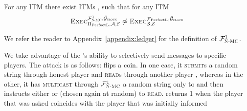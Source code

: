   \begin{theorem}
    \label{theorem:perfectledger}
    For any ITM \perfectprot{} there exist ITMs \perfectenv,
    \perfectadv{} such that for any ITM \simulator
    \begin{equation*}
      \textsc{Exec}^{\mathcal{F}_{\textsc{N-MC}}^1, \bar{\mathcal{G}}_{\textsc{clock}}}_{\Pi_{\mathrm{PerfectL}}, \mathcal{A},
      \mathcal{E}} \not\approx \textsc{Exec}^{\mathcal{F}_{\mathrm{PerfectL}},
      \bar{\mathcal{G}}_{\textsc{clock}}}_{\mathcal{S}, \mathcal{E}}
    \end{equation*}
  \end{theorem}

  We refer the reader to Appendix~\ref{appendix:ledger} for the definition of
  $\mathcal{F}_{\textsc{N-MC}}^1$.

  \begin{proofsketch}
    We take advantage of the \adversary's ability to selectively send messages
    to specific players. The attack is as follows: \environment{} flips a coin.
    In one case, it \textsc{submit}s a random string through honest player
    \alice{} and \textsc{read}s through another player \bob,
    whereas in the other, it has \adversary{} \textsc{multicast} through
    $\mathcal{F}_{\textsc{N-MC}}^1$ a random string only to \alice and then instructs either
    \alice{} or \bob{} (chosen again at random) to \textsc{read}. \environment{}
    returns 1 when the player that was asked coincides with the player that was
    initially informed 
  \end{proofsketch}

